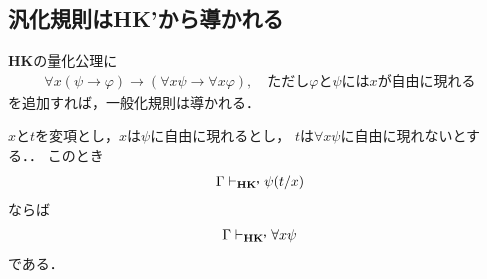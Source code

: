 \subsection{汎化規則は{\bf HK'}から導かれる}
	{\bf HK}の量化公理に
	\begin{align}
		\forall x (\psi \rightarrow \varphi) \rightarrow
		(\forall x \psi \rightarrow \forall x \varphi),
		\quad \mbox{ただし$\varphi$と$\psi$には$x$が自由に現れる}
	\end{align}
	を追加すれば，一般化規則は導かれる．
	
	\begin{screen}
		$x$と$t$を変項とし，$x$は$\psi$に自由に現れるとし，
		$t$は$\forall x \psi$に自由に現れないとする．．
		このとき
		\begin{align}
			\Gamma \vdash_{{\scriptsize \mbox{{\bf HK'}}}} \psi(t/x)
		\end{align}
		ならば
		\begin{align}
			\Gamma \vdash_{{\scriptsize \mbox{{\bf HK'}}}} \forall x \psi
		\end{align}
		である．
	\end{screen}
	
